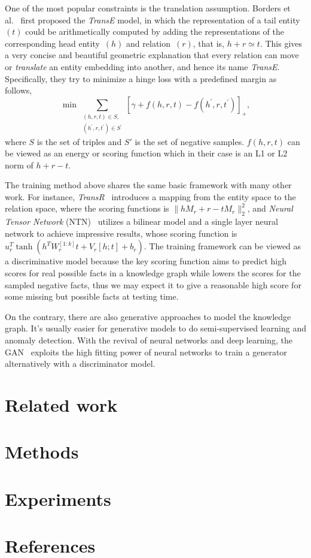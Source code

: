 \documentclass[twocolumn,a4paper,10pt,review,3p]{elsarticle}
\begin{document}
One of the most popular constraints is the translation assumption. Borders et al.~\cite{TransE2013} first proposed the \emph{TransE} model, in which the representation of a tail entity~$(t)$ could be arithmetically computed by adding the representations of the corresponding head entity~$(h)$ and relation~$(r)$, that is, $h + r \simeq t$. This gives a very concise and beautiful geometric explanation that every relation can move or \emph{translate} an entity embedding into another, and hence its name \emph{TransE}. Specifically, they try to minimize a hinge loss with a predefined margin as follows,
\[
    \min\sum_{\substack{(h, r, t)\in S,\\ (h^\prime, r, t^\prime)\in S^\prime }}
        {\left[\gamma + f(h, r, t) - f(h^\prime, r, t^\prime)\right]}_+,
\]
where $S$ is the set of triples and $S'$ is the set of negative samples. $f(h, r, t)$ can be viewed as an energy or scoring function which in their case is an L1 or L2 norm of $h + r - t$.

The training method above shares the same basic framework with many other work. For instance, \emph{TransR}~\cite{TransR2015} introduces a mapping from the entity space to the relation space, where the scoring functions is $\parallel h M_r + r - t M_r \parallel_2^2 $, and \emph{Neural Tensor Network} (NTN)~\cite{NTN} utilizes a bilinear model and a single layer neural network to achieve impressive results, whose scoring function is $u_r^T \tanh(h^T W_r^{[1:k]}t + V_r[h;t] + b_r)$. The training framework can be viewed as a discriminative model because the key scoring function aims to predict high scores for real possible facts in a knowledge graph while lowers the scores for the sampled negative facts, thus we may expect it to give a reasonable high score for some missing but possible facts at testing time.

On the contrary, there are also generative approaches to model the knowledge graph. It's usually easier for generative models to do semi-supervised learning and anomaly detection. With the revival of neural networks and deep learning, the GAN~\cite{GAN} exploits the high fitting power of neural networks to train a generator alternatively with a discriminator model. 


\section{Related work}


\section{Methods}


\section{Experiments}


\section*{References}


\end{document}
